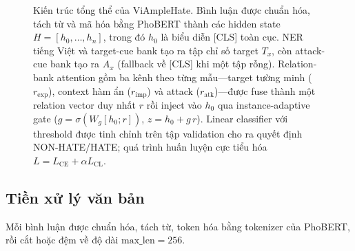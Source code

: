 \documentclass[11pt]{article}
\begin{document}
\begin{figure}[!t]
{%
  }
  \caption{Kiến trúc tổng thể của ViAmpleHate. Bình luận được chuẩn hóa, tách từ và mã hóa bằng PhoBERT thành các hidden state $H=[h_0,\dots,h_n]$, trong đó $h_0$ là biểu diễn [CLS] toàn cục. NER tiếng Việt và target-cue bank tạo ra tập chỉ số target $T_x$, còn attack-cue bank tạo ra $A_x$ (fallback về [CLS] khi một tập rỗng). Relation-bank attention gồm ba kênh theo từng mẫu---target tường minh ($r_{\mathrm{exp}}$), context hàm ẩn ($r_{\mathrm{imp}}$) và attack ($r_{\mathrm{atk}}$)---được fuse thành một relation vector duy nhất $r$ rồi inject vào $h_0$ qua instance-adaptive gate ($g=\sigma(W_g[h_0;r])$, $z=h_0+g\,r$). Linear classifier với threshold được tinh chỉnh trên tập validation cho ra quyết định NON-HATE/HATE; quá trình huấn luyện cực tiểu hóa $L=L_{\mathrm{CE}}+\alpha L_{\mathrm{CL}}$.}
  \label{fig:arch}
\end{figure}

\subsection{Tiền xử lý văn bản}
Mỗi bình luận được chuẩn hóa, tách từ, token hóa bằng tokenizer của PhoBERT, rồi cắt hoặc đệm về độ dài $\mathrm{max\_len}=256$.
\end{document}
